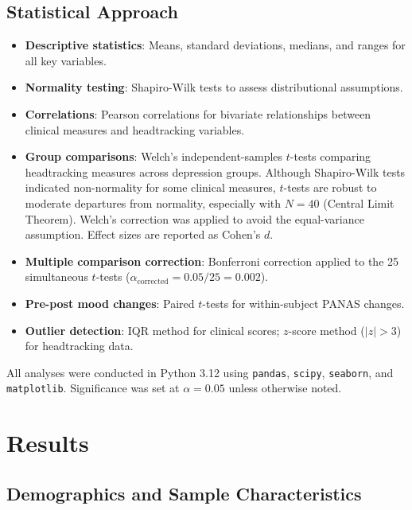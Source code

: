 \documentclass[12pt]{article}
\begin{document}
\subsection{Statistical Approach}
\begin{itemize}
    \item \textbf{Descriptive statistics}: Means, standard deviations, medians, and ranges for all key variables.
    \item \textbf{Normality testing}: Shapiro-Wilk tests to assess distributional assumptions.
    \item \textbf{Correlations}: Pearson correlations for bivariate relationships between clinical measures and headtracking variables.
    \item \textbf{Group comparisons}: Welch's independent-samples $t$-tests comparing headtracking measures across depression groups. Although Shapiro-Wilk tests indicated non-normality for some clinical measures, $t$-tests are robust to moderate departures from normality, especially with $N = 40$ (Central Limit Theorem). Welch's correction was applied to avoid the equal-variance assumption. Effect sizes are reported as Cohen's $d$.
    \item \textbf{Multiple comparison correction}: Bonferroni correction applied to the 25 simultaneous $t$-tests ($\alpha_{\text{corrected}} = 0.05 / 25 = 0.002$).
    \item \textbf{Pre-post mood changes}: Paired $t$-tests for within-subject PANAS changes.
    \item \textbf{Outlier detection}: IQR method for clinical scores; $z$-score method ($|z| > 3$) for headtracking data.
\end{itemize}

All analyses were conducted in Python 3.12 using \texttt{pandas}, \texttt{scipy}, \texttt{seaborn}, and \texttt{matplotlib}. Significance was set at $\alpha = 0.05$ unless otherwise noted.

\section{Results}

\subsection{Demographics and Sample Characteristics}
\end{document}
